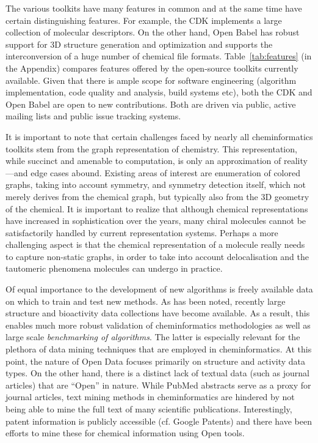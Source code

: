 \documentclass{sig-alternate}
\begin{document}
The various toolkits have many features in common and at the same time
have certain distinguishing features. For example, the CDK implements
a large collection of molecular descriptors. On the other hand,
Open Babel has robust support for 3D structure generation and
optimization and supports the interconversion of a huge number of
chemical file formats. Table~\ref{tab:features} (in the Appendix) compares features offered by the open-source toolkits currently available.
Given that there is ample scope for software engineering (algorithm
implementation, code quality and analysis, build systems etc), both
the CDK and Open Babel are open to new contributions. Both are driven
via public, active mailing lists and public issue tracking systems.

It is important to note that certain challenges faced by nearly
all cheminformatics toolkits stem from the graph representation of
chemistry. This representation, while succinct and amenable to
computation, is only an approximation of reality---and edge cases
abound. Existing areas of interest are enumeration of colored graphs,
taking into account symmetry, and symmetry detection itself, which not
merely derives from the chemical graph, but typically also from the 3D
geometry of the chemical. It is important to
realize that although chemical representations have increased in
sophistication over the years, many chiral molecules cannot be
satisfactorily handled by current representation systems. Perhaps a more challenging aspect is that
the chemical representation of a molecule really needs to capture non-static
graphs, in order to take into account delocalisation and the tautomeric
phenomena molecules can undergo in practice. 

Of equal importance to the development of new algorithms is freely
available data on which to train and test new methods. As has been noted, recently
large structure and bioactivity data collections have become
available. As a result, this enables much more robust validation of
cheminformatics methodologies as well as large scale \emph{benchmarking of
algorithms}. The latter is especially relevant for the plethora of
data mining techniques that are employed in cheminformatics. At this
point, the nature of Open Data focuses primarily on structure and
activity data types. On the other hand, there is a distinct lack of
textual data (such as journal articles) that are ``Open'' in nature. While
PubMed abstracts serve as a proxy for journal articles, text mining
methods in cheminformatics are hindered by not being able to mine the full text of many scientific publications.
Interestingly, patent information is publicly accessible (cf. Google
Patents) and there have been efforts to mine these for chemical
information using Open tools.
\end{document}
